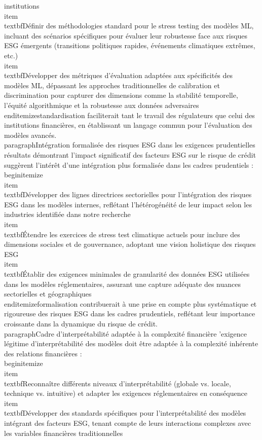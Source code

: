 institutions\n    \n    \\item \\textbf{Définir des méthodologies standard pour le stress testing} des modèles ML, incluant des scénarios spécifiques pour évaluer leur robustesse face aux risques ESG émergents (transitions politiques rapides, événements climatiques extrêmes, etc.)\n    \n    \\item \\textbf{Développer des métriques d'évaluation adaptées aux spécificités des modèles ML}, dépassant les approches traditionnelles de calibration et discrimination pour capturer des dimensions comme la stabilité temporelle, l'équité algorithmique et la robustesse aux données adversaires\n\\end{itemize}\n\nCette standardisation faciliterait tant le travail des régulateurs que celui des institutions financières, en établissant un langage commun pour l'évaluation des modèles avancés.\n\n\\paragraph{Intégration formalisée des risques ESG dans les exigences prudentielles} \n\nNos résultats démontrant l'impact significatif des facteurs ESG sur le risque de crédit suggèrent l'intérêt d'une intégration plus formalisée dans les cadres prudentiels :\n\n\\begin{itemize}\n    \\item \\textbf{Développer des lignes directrices sectorielles} pour l'intégration des risques ESG dans les modèles internes, reflétant l'hétérogénéité de leur impact selon les industries identifiée dans notre recherche\n    \n    \\item \\textbf{Étendre les exercices de stress test climatique} actuels pour inclure des dimensions sociales et de gouvernance, adoptant une vision holistique des risques ESG\n    \n    \\item \\textbf{Établir des exigences minimales de granularité des données ESG} utilisées dans les modèles réglementaires, assurant une capture adéquate des nuances sectorielles et géographiques\n\\end{itemize}\n\nCette formalisation contribuerait à une prise en compte plus systématique et rigoureuse des risques ESG dans les cadres prudentiels, reflétant leur importance croissante dans la dynamique du risque de crédit.\n\n\\paragraph{Cadre d'interprétabilité adaptée à la complexité financière} \n\nL'exigence légitime d'interprétabilité des modèles doit être adaptée à la complexité inhérente des relations financières :\n\n\\begin{itemize}\n    \\item \\textbf{Reconnaître différents niveaux d'interprétabilité} (globale vs. locale, technique vs. intuitive) et adapter les exigences réglementaires en conséquence\n    \n    \\item \\textbf{Développer des standards spécifiques pour l'interprétabilité} des modèles intégrant des facteurs ESG, tenant compte de leurs interactions complexes avec les variables financières traditionnelles\n  